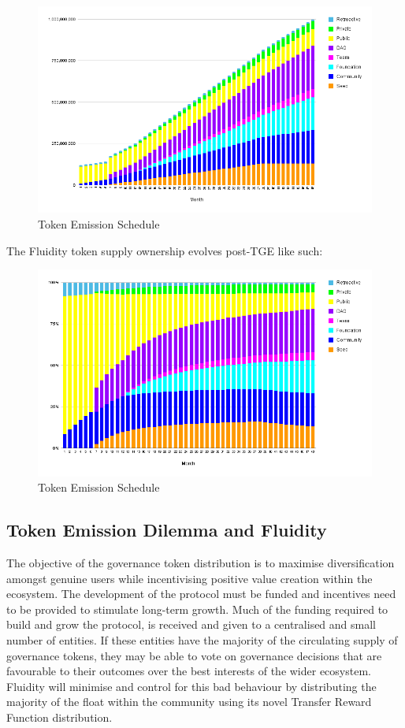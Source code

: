 \begin{figure}[h]
    \centering
    \includegraphics[width=12cm]{images/chart (19).png}
    \caption{Token Emission Schedule}
\end{figure}


\vspace{1em}

\newpage

The Fluidity token supply ownership evolves post-TGE like such:

\begin{figure}[h]
    \centering
    \includegraphics[width=12cm]{images/chart (18).png}
    \caption{Token Emission Schedule}
\end{figure}


\subsection{Token Emission Dilemma and Fluidity}

The objective of the governance token distribution is to maximise diversification amongst genuine users while incentivising positive value creation within the ecosystem. The development of the protocol must be funded and incentives need to be provided to stimulate long-term growth. Much of the funding required to build and grow the protocol, is received and given to a centralised and small number of entities. If these entities have the majority of the circulating supply of governance tokens, they may be able to vote on governance decisions that are favourable to their outcomes over the best interests of the wider ecosystem. Fluidity will minimise and control for this bad behaviour by distributing the majority of the float within the community using its novel Transfer Reward Function distribution.

